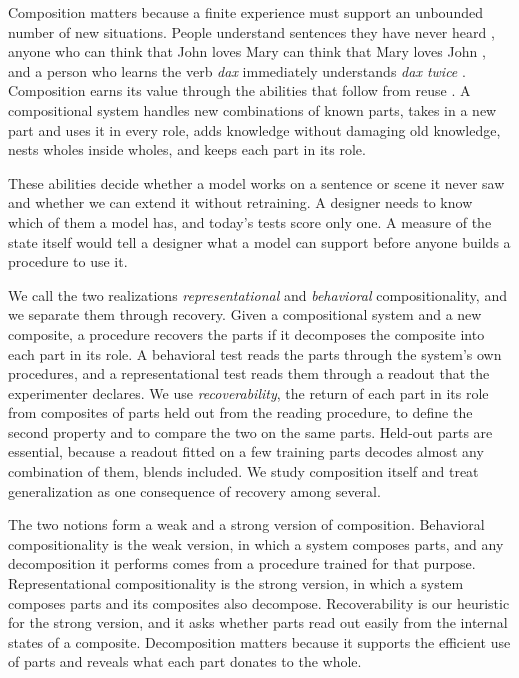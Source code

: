 \documentclass[10pt]{article}
\theoremstyle{plain}
\theoremstyle{remark}
\begin{document}
Composition matters because a finite experience must support an unbounded number of new situations. People understand sentences they have never heard \citep{chomsky1957}, anyone who can think that John loves Mary can think that Mary loves John \citep{fodor1988}, and a person who learns the verb \emph{dax} immediately understands \emph{dax twice} \citep{lake2018}. Composition earns its value through the abilities that follow from reuse \citep{lake2017}. A compositional system handles new combinations of known parts, takes in a new part and uses it in every role, adds knowledge without damaging old knowledge, nests wholes inside wholes, and keeps each part in its role.

These abilities decide whether a model works on a sentence or scene it never saw and whether we can extend it without retraining. A designer needs to know which of them a model has, and today's tests score only one. A measure of the state itself would tell a designer what a model can support before anyone builds a procedure to use it.

We call the two realizations \emph{representational} and \emph{behavioral} compositionality, and we separate them through recovery. Given a compositional system and a new composite, a procedure recovers the parts if it decomposes the composite into each part in its role. A behavioral test reads the parts through the system's own procedures, and a representational test reads them through a readout that the experimenter declares. We use \emph{recoverability}, the return of each part in its role from composites of parts held out from the reading procedure, to define the second property and to compare the two on the same parts. Held-out parts are essential, because a readout fitted on a few training parts decodes almost any combination of them, blends included. We study composition itself and treat generalization as one consequence of recovery among several.

The two notions form a weak and a strong version of composition. Behavioral compositionality is the weak version, in which a system composes parts, and any decomposition it performs comes from a procedure trained for that purpose. Representational compositionality is the strong version, in which a system composes parts and its composites also decompose. Recoverability is our heuristic for the strong version, and it asks whether parts read out easily from the internal states of a composite. Decomposition matters because it supports the efficient use of parts and reveals what each part donates to the whole.
\end{document}
